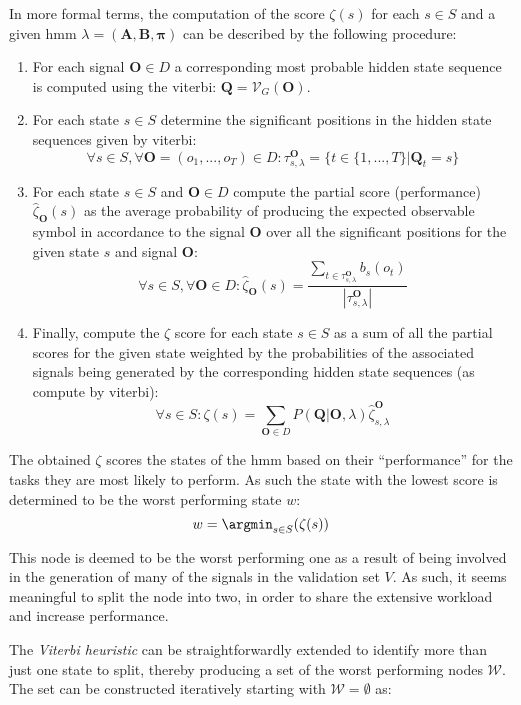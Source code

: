 In more formal terms, the computation of the score $\zeta(s)$ for each $s \in S$ and a given \gls{hmm} $\lambda = (\mathbf{A}, \mathbf{B}, \boldsymbol{\pi})$ can be described by the following procedure:
\begin{enumerate}
	\item For each signal $\mathbf{O}\in D$ a corresponding most probable hidden state sequence is computed using the \gls{viterbi}: $\mathbf{Q}=\mathcal{V}_G(\mathbf{O})$.
	\item For each state $s\in S$ determine the significant positions in the hidden state sequences given by \gls{viterbi}:
	$$\forall s\in S,\forall \mathbf{O}=(o_1, ..., o_T)\in D: \tau_{s, \lambda}^\mathbf{O}=\{t\in\{1, ..., T\}|\mathbf{Q}_t=s\}$$
	\item For each state $s \in S$  and $\mathbf{O}\in D$ compute the partial score (performance) $\hat\zeta_{\mathbf{O}}(s)$ as the average probability of producing the expected observable symbol in accordance to the signal $\mathbf{O}$ over all the significant positions for the given state $s$ and signal $\mathbf{O}$:
	$$\forall s\in S,\forall \mathbf{O}\in D: \hat{\zeta}_{\mathbf{O}}(s) = \frac{\sum_{t\in\tau_{s, \lambda}^{\mathbf{O}}}b_s(o_t)}{|\tau_{s, \lambda}^{\mathbf{O}}|}$$
	\item Finally, compute the $\zeta$ score for each state $s\in S$ as a sum of all the partial scores for the given state weighted by the probabilities of the associated signals being generated by the corresponding hidden state sequences (as compute by \gls{viterbi}):
	$$\forall s\in S: \zeta(s)=\sum_{\mathbf{O}\in D}P(\mathbf{Q}|\mathbf{O}, \lambda)\hat\zeta_{s, \lambda}^{\mathbf{O}}$$
\end{enumerate}

The obtained $\zeta$ scores the states of the \gls{hmm} based on their ``performance'' for the tasks they are most likely to perform. As such the state with the lowest score is determined to be the worst performing state $w$: $$w = \argmin_{s\in S}(\zeta(s))$$

This node is deemed to be the worst performing one as a result of being involved in the generation of many of the signals in the validation set $V$. As such, it seems meaningful to split the node into two, in order to share the extensive workload and increase performance.

The \emph{Viterbi heuristic} can be straightforwardly extended to identify more than just one state to split, thereby producing a set of the worst performing nodes $\mathcal{W}$. The set can be constructed iteratively starting with $\mathcal{W} = \emptyset$ as:

